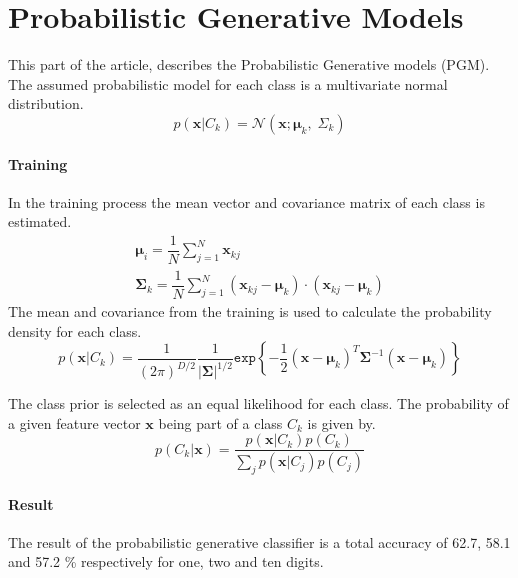 \section*{Probabilistic Generative Models}
This part of the article, describes the Probabilistic Generative models (PGM).
The assumed probabilistic model for each class is a multivariate normal distribution. 
\begin{equation}
p(\mathbf{x}|C_k)=
\mathcal{N}(\mathbf{x};\mathbf{\mu}_k, \; \Sigma_k) 
\label{eq:gauss_dist} 
\end{equation}

\paragraph*{Training}
In the training process the mean vector and covariance matrix of each class is estimated.
\begin{eqnarray}
\bm{\mu}_i= \dfrac{1}{N} \sum_{j=1}^{N} \mathbf{x}_{kj} \\
\bm{\Sigma}_k =\dfrac{1}{N} \sum_{j=1}^{N} (\mathbf{x}_{kj}-\bm{\mu}_k) \cdot (\mathbf{x}_{kj}-\bm{\mu}_k)
\end{eqnarray}
The mean and covariance from the training is used to calculate the probability density for each class.
\begin{equation}
p(\mathbf{x}|C_k)=  
\dfrac{1}{(2\pi)^{D/2}} \dfrac{1}{\left|\mathbf{\Sigma} \right|^{1/2}} 
\mathtt{exp} \left\lbrace -\dfrac{1}{2} (\mathbf{x}-\mathbf{\mu}_k)^T \mathbf{\Sigma}^{-1} (\mathbf{x}-\mathbf{\mu}_k) \right\rbrace
\end{equation}

The class prior is selected as an equal likelihood for each class. The probability of a given feature vector $ \mathbf{x} $ being part of a class $ C_k $ is given by.
\begin{equation}
p(C_k |\mathbf{x}) =
\dfrac{p(\mathbf{x}|C_k) p(C_k)}
{\sum_j p(\mathbf{x}|C_j) p(C_j)}
\end{equation}

\paragraph*{Result}
The result of the probabilistic generative classifier is a total accuracy of 62.7, 58.1 and 57.2 \% respectively for one, two and ten digits. 